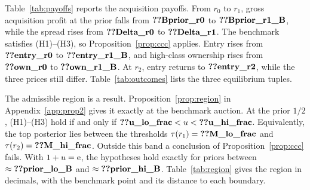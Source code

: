 Table~\ref{tab:payoffs} reports the acquisition payoffs. From \(r_0\) to \(r_1\), gross acquisition profit at the
prior falls from \(\reg{Bprior_r0}\) to \(\reg{Bprior_r1_B}\), while the spread rises from \(\reg{Delta_r0}\) to
\(\reg{Delta_r1}\). The benchmark satisfies (H1)--(H3), so Proposition~\ref{prop:ccc} applies. Entry rises from
\(\reg{entry_r0}\) to \(\reg{entry_r1_B}\), and high-class ownership rises from \(\reg{own_r0}\) to
\(\reg{own_r1_B}\). At \(r_2\), entry returns to \(\reg{entry_r2}\), while the three prices still differ.
Table~\ref{tab:outcomes} lists the three equilibrium tuples.

The admissible region is a result. Proposition~\ref{prop:region} in Appendix~\ref{app:prop2} gives it exactly at the
benchmark auction. At the prior \(1/2\), (H1)--(H3) hold if and only if \(\reg{u_lo_frac}<u<\reg{u_hi_frac}\).
Equivalently, the top posterior lies between the thresholds \(\tau(r_1)=\reg{M_lo_frac}\) and
\(\tau(r_2)=\reg{M_hi_frac}\). Outside this band a conclusion of Proposition~\ref{prop:ccc} fails. With \(1+u=\mathrm{e}\),
the hypotheses hold exactly for priors between \(\approx\reg{prior_lo_B}\) and \(\approx\reg{prior_hi_B}\).
Table~\ref{tab:region} gives the region in decimals, with the benchmark point and its distance to each boundary.

